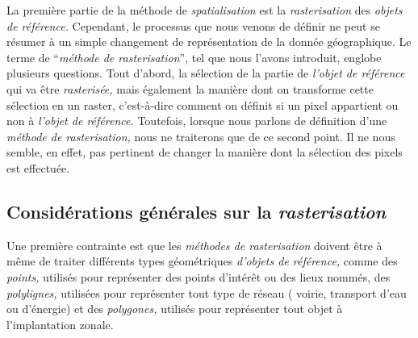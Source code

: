 La première partie de la méthode de \emph{spatialisation} est la
\emph{rasterisation} des \emph{objets de référence.} Cependant, le
processus que nous venons de définir ne peut se résumer à un simple
changement de représentation de la donnée géographique. Le terme de
\enquote{\emph{méthode de rasterisation}}, tel que nous l'avons
introduit, englobe plusieurs questions. Tout d'abord, la sélection de
la partie de \emph{l'objet de référence} qui va être
\emph{rasterisée,} mais également la manière dont on transforme cette
sélection en un raster, c'est-à-dire comment on définit si un pixel
appartient ou non à \emph{l'objet de référence.} Toutefois, lorsque
nous parlons de définition d'une \emph{méthode de rasterisation,} nous
ne traiterons que de ce second point. Il ne nous semble, en effet, pas
pertinent de changer la manière dont la sélection des pixels est
effectuée.

\subsection{Considérations générales sur la \emph{rasterisation}}

Une première contrainte est que les \emph{méthodes de rasterisation}
doivent être à même de traiter différents types géométriques
\emph{d'objets de référence,} comme des \emph{points,} utilisés pour
représenter des points d’intérêt ou des lieux nommés, des
\emph{polylignes,} utilisées pour représenter tout type de réseau (\eg
voirie, transport d'eau ou d'énergie) et des \emph{polygones,}
utilisés pour représenter tout objet à l’implantation zonale.

